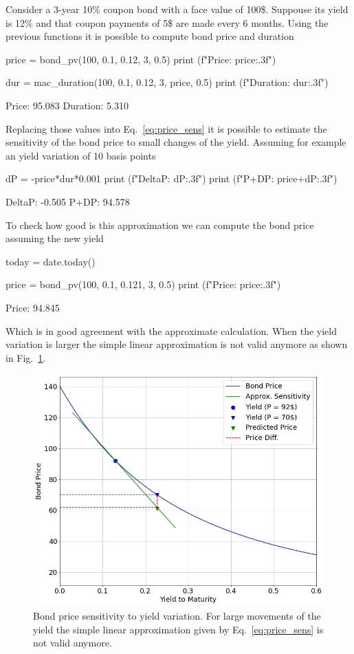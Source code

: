 Consider a 3-year 10\% coupon bond with a face value of 100\$. Suppouse its yield is 12\% and that coupon payments of 5\$ are made every 6 months. Using the previous functions it is possible to compute bond price and duration

\begin{ipythonnon}
price = bond_pv(100, 0.1, 0.12, 3, 0.5)
print (f"Price: {price:.3f}")

dur = mac_duration(100, 0.1, 0.12, 3, price, 0.5)
print (f"Duration: {dur:.3f}")
\end{ipythonnon}
\begin{ioutput}
Price: 95.083
Duration: 5.310
\end{ioutput}

Replacing those values into Eq.~\ref{eq:price_sens} it is possible to estimate the sensitivity of the bond price to small changes of the yield.
Assuming for example an yield variation of 10 basis points
\begin{ipythonnon}
dP = -price*dur*0.001
print (f"DeltaP: {dP:.3f}")
print (f"P+DP: {price+dP:.3f}")
\end{ipythonnon}
\begin{ioutput}
DeltaP: -0.505
P+DP: 94.578
\end{ioutput}

To check how good is this approximation we can compute the bond price assuming the new yield
\begin{ipythonnon}
today = date.today()

price = bond_pv(100, 0.1, 0.121, 3, 0.5)
print (f"Price: {price:.3f}")
\end{ipythonnon}
\begin{ioutput}
Price: 94.845
\end{ioutput}

Which is in good agreement with the approximate calculation.
When the yield variation is larger the simple linear approximation is not valid anymore as shown in Fig.~\ref{fig:bond_sensitivity}.

\begin{figure}[htbp]
\centering
\includegraphics[width=0.7\linewidth]{figures/bond_duration}
\caption{Bond price sensitivity to yield variation. For large movements of the yield the simple linear approximation given by
 Eq.~\ref{eq:price_sens} is not valid anymore.}
\label{fig:bond_sensitivity}
\end{figure}

